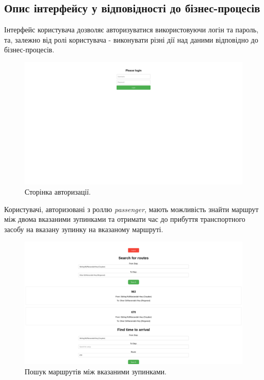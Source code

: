 \documentclass[oneside,14pt]{extarticle}
\begin{document}
\subsection{Опис інтерфейсу у відповідності до бізнес-процесів}
Інтерфейс користувача дозволяє авторизуватися використовуючи логін та пароль, та, залежно від ролі користувача - виконувати різні дії над даними відповідно до бізнес-процесів.

\begin{figure}[H]
\centering
\includegraphics[scale=0.25]{1}
\caption{Сторінка авторизації.}
\end{figure}

Користувачі, авторизовані з роллю \textit{passenger}, мають можливість знайти маршрут між двома вказаними зупинками та отримати час до прибуття транспортного засобу на вказану зупинку на вказаному маршруті.

\begin{figure}[H]
\centering
\includegraphics[scale=0.25]{2}
\caption{Пошук маршрутів між вказаними зупинками.}
\end{figure}
\end{document}
